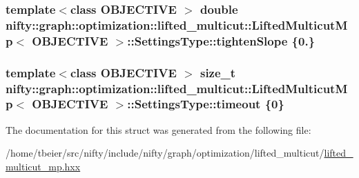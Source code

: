 \subsubsection[{tighten\+Slope}]{\setlength{\rightskip}{0pt plus 5cm}template$<$class O\+B\+J\+E\+C\+T\+I\+V\+E $>$ double {\bf nifty\+::graph\+::optimization\+::lifted\+\_\+multicut\+::\+Lifted\+Multicut\+Mp}$<$ O\+B\+J\+E\+C\+T\+I\+V\+E $>$\+::Settings\+Type\+::tighten\+Slope \{0.\}}\label{structnifty_1_1graph_1_1optimization_1_1lifted__multicut_1_1LiftedMulticutMp_1_1SettingsType_a46fd28b3a73e8d434acae10b31afb841}
\hypertarget{structnifty_1_1graph_1_1optimization_1_1lifted__multicut_1_1LiftedMulticutMp_1_1SettingsType_aa8d994d15984ce8c000d93cfd3d89246}{}
\subsubsection[{timeout}]{\setlength{\rightskip}{0pt plus 5cm}template$<$class O\+B\+J\+E\+C\+T\+I\+V\+E $>$ size\+\_\+t {\bf nifty\+::graph\+::optimization\+::lifted\+\_\+multicut\+::\+Lifted\+Multicut\+Mp}$<$ O\+B\+J\+E\+C\+T\+I\+V\+E $>$\+::Settings\+Type\+::timeout \{0\}}\label{structnifty_1_1graph_1_1optimization_1_1lifted__multicut_1_1LiftedMulticutMp_1_1SettingsType_aa8d994d15984ce8c000d93cfd3d89246}


The documentation for this struct was generated from the following file\+:\begin{DoxyCompactItemize}
\item 
/home/tbeier/src/nifty/include/nifty/graph/optimization/lifted\+\_\+multicut/\hyperlink{lifted__multicut__mp_8hxx}{lifted\+\_\+multicut\+\_\+mp.\+hxx}\end{DoxyCompactItemize}
